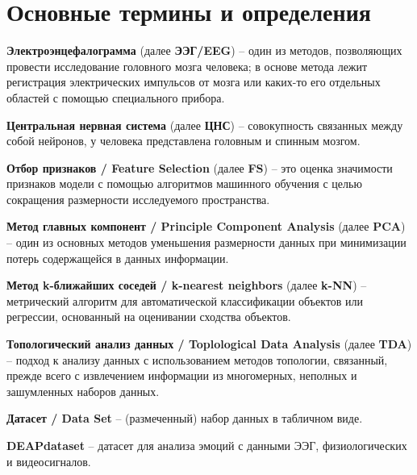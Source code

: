 \documentclass{article}
\begin{document}
\makeTitlePage
{
  \hypersetup{linkcolor=black}
  \tableofcontents
}

\section{Основные термины и определения}


\textbf{Электроэнцефалограмма} (далее \textbf{ЭЭГ/EEG}) -- один из методов, позволяющих провести исследование головного мозга человека; в основе метода лежит регистрация электрических импульсов от мозга или каких-то его отдельных областей с помощью специального прибора.

\textbf{Центральная нервная система} (далее \textbf{ЦНС}) -- совокупность связанных между собой нейронов, у человека представлена головным и спинным мозгом.

\textbf{Отбор признаков / Feature Selection} (далее \textbf{FS}) -- это оценка значимости признаков модели с помощью алгоритмов машинного обучения с целью сокращения размерности исследуемого пространства.

\textbf{Метод главных компонент / Principle Component Analysis} (далее \textbf{PCA}) -- один из основных методов уменьшения размерности данных при минимизации потерь содержащейся в данных информации.

\textbf{Метод k-ближайших соседей / k-nearest neighbors} (далее \textbf{k-NN}) -- метрический алгоритм для автоматической классификации объектов или регрессии, основанный на оценивании сходства объектов.

\textbf{Топологический анализ данных / Toplological Data Analysis} (далее \textbf{TDA}) -- подход к анализу данных с использованием методов топологии, связанный, прежде всего с извлечением информации из многомерных, неполных и зашумленных наборов данных.

\textbf{Датасет / Data Set} -- (размеченный) набор данных в табличном виде.

\textbf{DEAPdataset} -- датасет для анализа эмоций с данными ЭЭГ, физиологических и видеосигналов.
\end{document}
